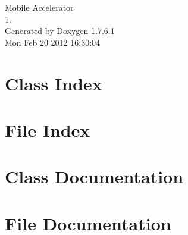 \documentclass[a4paper]{book}
\begin{document}
\hypersetup{pageanchor=false,citecolor=blue}
\begin{titlepage}
\vspace*{7cm}
\begin{center}
{\Large \-Mobile \-Accelerator \\[1ex]\large 1. }\\
\vspace*{1cm}
{\large \-Generated by Doxygen 1.7.6.1}\\
\vspace*{0.5cm}
{\small Mon Feb 20 2012 16:30:04}\\
\end{center}
\end{titlepage}
\clearemptydoublepage
{}
\tableofcontents
\clearemptydoublepage
{}
\hypersetup{pageanchor=true,citecolor=blue}
\chapter{\-Class \-Index}

\chapter{\-File \-Index}

\chapter{\-Class \-Documentation}





























\chapter{\-File \-Documentation}



\printindex
\end{document}
